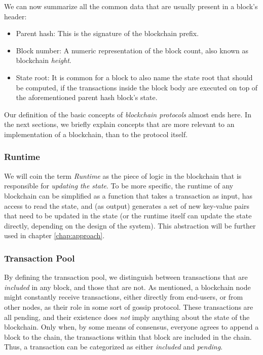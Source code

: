 We can now summarize all the common data that are usually present in a block's header:

\begin{itemize}
	\item Parent hash: This is the signature of the blockchain prefix.
	\item Block number: A numeric representation of the block count, also known as blockchain
	\textit{height}.
	\item State root: It is common for a block to also name the state root that should be computed,
	if the transactions inside the block body are executed on top of the aforementioned parent hash
	block's state.
\end{itemize}

Our definition of the basic concepts of \textit{blockchain protocols} almost ends here. In the next
sections, we briefly explain concepts that are more relevant to an implementation of a blockchain,
than to the protocol itself.

\subsubsection{Runtime} \label{chap_bg:subsec:runtime}

We will coin the term \textit{Runtime} as the piece of logic in the blockchain that is responsible
for \textit{updating the state}. To be more specific, the runtime of any blockchain can be
simplified as a function that takes a transaction as input, has access to read the state, and (as
output) generates a set of new key-value pairs that need to be updated in the state (or the runtime
itself can update the state directly, depending on the design of the system). This abstraction will
be further used in chapter \ref{chap:approach}.

\subsubsection{Transaction Pool} \label{chap_bg:subsec:tx_pool}

By defining the transaction pool, we distinguish between transactions that are \textit{included} in
any block, and those that are not. As mentioned, a blockchain node might constantly receive
transactions, either directly from end-users, or from other nodes, as their role in some sort of
gossip protocol. These transactions are all pending, and their existence does \textit{not} imply
anything about the state of the blockchain. Only when, by some means of consensus, everyone agrees
to append a block to the chain, the transactions within that block are included in the chain. Thus,
a transaction can be categorized as either \textit{included} and \textit{pending}.

